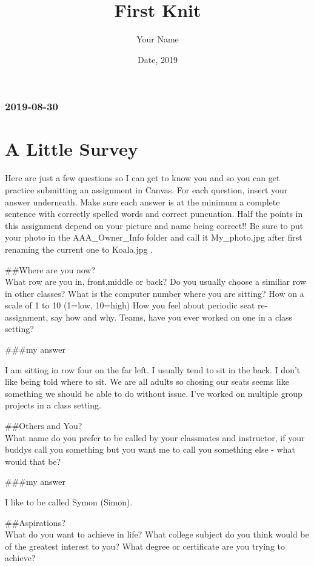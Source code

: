 \documentclass[]{article}
\title{First Knit}
\author{Your Name}
\date{Date, 2019}
\begin{document}
\maketitle

{
\setcounter{tocdepth}{2}
\tableofcontents
}
\hypertarget{section}{%
\subsubsection{2019-08-30}\label{section}}

\hypertarget{a-little-survey}{%
\section{A Little Survey}\label{a-little-survey}}

Here are just a few questions so I can get to know you and so you can
get practice submitting an assignment in Canvas. For each question,
insert your answer underneath. Make sure each answer is at the minimum a
complete sentence with correctly spelled words and correct puncuation.
Half the points in this assignment depend on your picture and name being
correct!! Be sure to put your photo in the AAA\_Owner\_Info folder and
call it My\_photo.jpg after first renaming the current one to Koala.jpg
.

\#\#Where are you now?\\
What row are you in, front,middle or back? Do you usually choose a
similiar row in other classes? What is the computer number where you are
sitting? How on a scale of 1 to 10 (1=low, 10=high) How you feel about
periodic seat re-assignment, say how and why. Teams, have you ever
worked on one in a class setting?

\#\#\#my answer

I am sitting in row four on the far left. I usually tend to sit in the
back. I don't like being told where to sit. We are all adults so chosing
our seats seems like something we should be able to do without issue.
I've worked on multiple group projects in a class setting.

\#\#Others and You?\\
What name do you prefer to be called by your classmates and instructor,
if your buddys call you something but you want me to call you something
else - what would that be?

\#\#\#my answer

I like to be called Symon (Simon).

\#\#Aspirations?\\
What do you want to achieve in life? What college subject do you think
would be of the greatest interest to you? What degree or certificate are
you trying to achieve?
\end{document}
